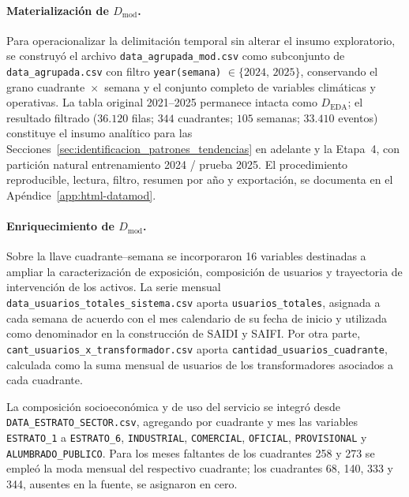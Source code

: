     \paragraph{Materialización de $D_{\mathrm{mod}}$.} Para operacionalizar la delimitación temporal sin alterar el insumo exploratorio, se construyó el archivo \texttt{data\_agrupada\_mod.csv} como subconjunto de \texttt{data\_agrupada.csv} con filtro \texttt{year(semana)} $\in \{2024,\,2025\}$, conservando el grano cuadrante~$\times$~semana y el conjunto completo de variables climáticas y operativas. La tabla original 2021--2025 permanece intacta como $D_{\mathrm{EDA}}$; el resultado filtrado ($36{.}120$ filas; $344$ cuadrantes; $105$ semanas; $33{.}410$ eventos) constituye el insumo analítico para las Secciones~\ref{sec:identificacion_patrones_tendencias} en adelante y la Etapa~4, con partición natural entrenamiento 2024 / prueba 2025. El procedimiento reproducible, lectura, filtro, resumen por año y exportación, se documenta en el Apéndice~\ref{app:html-datamod}.

    \paragraph{Enriquecimiento de $D_{\mathrm{mod}}$.} Sobre la llave
    cuadrante--semana se incorporaron 16 variables destinadas a ampliar la
    caracterización de exposición, composición de usuarios y trayectoria de
    intervención de los activos. La serie mensual
    \texttt{data\_usuarios\_totales\_sistema.csv} aporta
    \texttt{usuarios\_totales}, asignada a cada semana de acuerdo con el mes
    calendario de su fecha de inicio y utilizada como denominador en la
    construcción de SAIDI y SAIFI. Por otra parte,
    \texttt{cant\_usuarios\_x\_transformador.csv} aporta
    \texttt{cantidad\_usuarios\_cuadrante}, calculada como la suma mensual de
    usuarios de los transformadores asociados a cada cuadrante.

    La composición socioeconómica y de uso del servicio se integró desde
    \texttt{DATA\_ESTRATO\_SECTOR.csv}, agregando por cuadrante y mes las
    variables \texttt{ESTRATO\_1} a \texttt{ESTRATO\_6},
    \texttt{INDUSTRIAL}, \texttt{COMERCIAL}, \texttt{OFICIAL},
    \texttt{PROVISIONAL} y \texttt{ALUMBRADO\_PUBLICO}. Para los meses
    faltantes de los cuadrantes 258 y 273 se empleó la moda mensual del
    respectivo cuadrante; los cuadrantes 68, 140, 333 y 344, ausentes en la
    fuente, se asignaron en cero.

